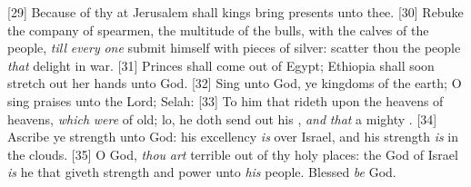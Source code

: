 [29] \textcolor[cmyk]{0.99998,1,0,0}{Because of thy   at Jerusalem shall kings bring presents unto thee.}
[30] \textcolor[cmyk]{0.99998,1,0,0}{Rebuke the company of spearmen, the multitude of the bulls, with the calves of the people, \emph{till} \emph{every} \emph{one} submit himself with pieces of silver: scatter thou the people \emph{that} delight in war.}
[31] \textcolor[cmyk]{0.99998,1,0,0}{Princes shall come out of Egypt; Ethiopia shall soon stretch out her hands unto God.}
[32] \textcolor[cmyk]{0.99998,1,0,0}{Sing unto God, ye kingdoms of the earth; O sing praises unto the Lord; Selah:}
[33] \textcolor[cmyk]{0.99998,1,0,0}{To him that rideth upon the heavens of heavens, \emph{which} \emph{were} of old; lo, he doth send out his  , \emph{and} \emph{that} a mighty  .}
[34] \textcolor[cmyk]{0.99998,1,0,0}{Ascribe ye strength unto God: his excellency \emph{is} over Israel, and his strength \emph{is} in the clouds.}
[35] \textcolor[cmyk]{0.99998,1,0,0}{O God, \emph{thou} \emph{art} terrible out of thy holy places: the God of Israel \emph{is} he that giveth strength and power unto \emph{his} people. Blessed \emph{be} God.}